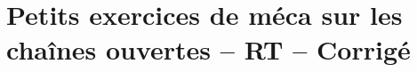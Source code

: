 \documentclass[10pt,fleqn]{article}
\newcommand{\repRel}{../..}
\newcommand{\repStyle}{\repRel/Style}
\newcommand{\td}{fichier_td}
\newcommand{\repExos}{\repRel/ExercicesCompetences}
\newcommand{\repExo}{dossier}
\begin{document}
\begin{multicols}{2}
\renewcommand{\repExo}{\repExos/C2_MettreEnOeuvreDemarche/C2_06_DeterminerLoisES/14_Sympact}
\renewcommand{\td}{14_Sympact}
\graphicspath{{\repStyle/png/}{\repExo/images/}}


\renewcommand{\repExo}{\repExos/B2_ProposerModele/B2_13_ModeliserCinematique/14_Sympact}
\renewcommand{\td}{14_Sympact}
\graphicspath{{\repStyle/png/}{\repExo/images/}}


\renewcommand{\repExo}{\repExos/C1_ProposerDemarche/C1_05_ProposerDemarcheActionMecaLoiMvt_PFS/14_Sympact}
\renewcommand{\td}{14_Sympact}
\graphicspath{{\repStyle/png/}{\repExo/images/}}


\renewcommand{\repExo}{\repExos/C2_MettreEnOeuvreDemarche/C2_07_PFS/14_Sympact}
\renewcommand{\td}{14_Sympact}
\graphicspath{{\repStyle/png/}{\repExo/images/}}


\renewcommand{\repExo}{\repExos/C2_MettreEnOeuvreDemarche/C2_09_DeterminerLoiMouvement1D/14_Sympact}
\renewcommand{\td}{14_Sympact}
\graphicspath{{\repStyle/png/}{\repExo/images/}}



\end{multicols}





\proftrue

\newpage

\section*{Petits exercices de méca sur les chaînes ouvertes -- RT -- Corrigé} 
\end{document}
